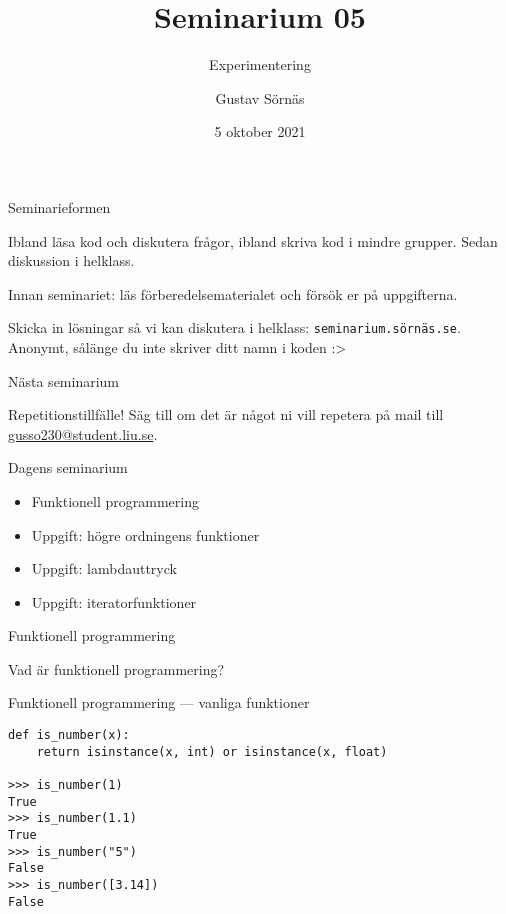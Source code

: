 \documentclass{beamer}
\title{Seminarium 05}
\subtitle{Experimentering}
\date{5 oktober 2021}
\author{Gustav Sörnäs}
\begin{document}
  \frame{\titlepage}

  \begin{frame}{Seminarieformen}

    Ibland läsa kod och diskutera frågor, ibland skriva kod i mindre grupper.
    Sedan diskussion i helklass.

    Innan seminariet: läs förberedelsematerialet och försök er på uppgifterna.

    Skicka in lösningar så vi kan diskutera i helklass:
    \texttt{seminarium.sörnäs.se}. Anonymt, sålänge du inte skriver ditt namn i
    koden :>

  \end{frame}

  \begin{frame}{Nästa seminarium}

    Repetitionstillfälle! Säg till om det är något ni vill repetera på mail
    till \url{gusso230@student.liu.se}.

  \end{frame}

  \begin{frame}{Dagens seminarium}

    \begin{itemize}
      \item Funktionell programmering
      \item Uppgift: högre ordningens funktioner
      \item Uppgift: lambdauttryck
      \item Uppgift: iteratorfunktioner
    \end{itemize}

  \end{frame}

  \begin{frame}{Funktionell programmering}

    Vad är funktionell programmering?

  \end{frame}

  \begin{frame}[fragile]{Funktionell programmering --- vanliga funktioner}

    \begin{lstlisting}
def is_number(x):
    return isinstance(x, int) or isinstance(x, float)

>>> is_number(1)
True
>>> is_number(1.1)
True
>>> is_number("5")
False
>>> is_number([3.14])
False
    \end{lstlisting}

  \end{frame}
\end{document}
